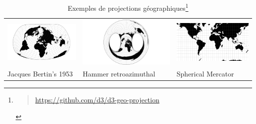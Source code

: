\documentclass[
  a4paper,
  DIV=11,
  numbers=noendperiod]{scrreprt}
\begin{document}
\begin{longtable}[]{@{}
  >{\raggedright\arraybackslash}p{}
  >{\raggedright\arraybackslash}p{}
  >{\raggedright\arraybackslash}p{}@{}}
\caption[Exemples de projections géographiques]{Exemples de projections
géographiques\footnote{\begin{quote}
  \url{https://github.com/d3/d3-geo-projection}
  \end{quote}}}\label{tbl-projGeo}\tabularnewline
\toprule\noalign{}
\endfirsthead
\endhead
\bottomrule\noalign{}
\endlastfoot
\includegraphics{media/10000000000003C0000001F4F33DE5F8AECF42B5.png} &
\includegraphics{media/10000000000003C0000001F46900D5D2AB4D8E23.png} &
\includegraphics{media/10000000000003C0000001F47F8100241BAEED66.png} \\
Jacques Bertin's 1953 & Hammer retroazimuthal & Spherical Mercator \\
\end{longtable}
\end{document}
